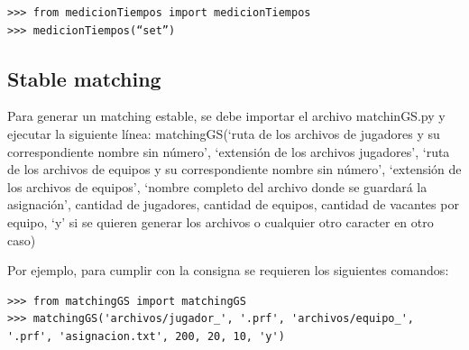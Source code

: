 \documentclass[titlepage,a4paper]{article}
\begin{document}
\begin{verbatim}
>>> from medicionTiempos import medicionTiempos
>>> medicionTiempos(“set”)
\end{verbatim}

\subsection{Stable matching}
 Para generar un matching estable, se debe importar el archivo matchinGS.py y ejecutar la siguiente línea:
matchingGS(‘ruta de los archivos  de jugadores y su correspondiente nombre sin número’, ‘extensión de los archivos jugadores’, ‘ruta de los archivos de equipos y su correspondiente nombre sin número’, ‘extensión de los archivos de equipos’, ‘nombre completo del archivo donde se guardará la asignación’, cantidad de jugadores, cantidad de equipos, cantidad de vacantes por equipo, ‘y’ si se quieren generar los archivos o cualquier otro caracter en otro caso)

Por ejemplo, para cumplir con la consigna se requieren los siguientes comandos:

\begin{verbatim}
>>> from matchingGS import matchingGS
>>> matchingGS('archivos/jugador_', '.prf', 'archivos/equipo_', '.prf', 'asignacion.txt', 200, 20, 10, 'y')
\end{verbatim}
\end{document}

